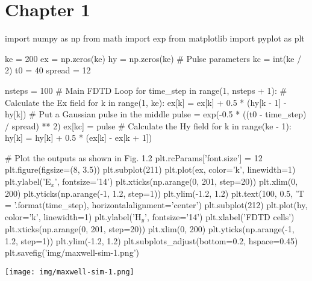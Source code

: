 
\section{Chapter 1}

\begin{python}
import numpy as np
from math import exp
from matplotlib import pyplot as plt
\end{python}

\begin{python}
ke = 200
ex = np.zeros(ke)
hy = np.zeros(ke)
# Pulse parameters
kc = int(ke / 2)
t0 = 40
spread = 12

nsteps = 100
# Main FDTD Loop
for time_step in range(1, nsteps + 1):
  # Calculate the Ex field
  for k in range(1, ke):
    ex[k] = ex[k] + 0.5 * (hy[k - 1] - hy[k])
  # Put a Gaussian pulse in the middle
  pulse = exp(-0.5 * ((t0 - time_step) / spread) ** 2)
  ex[kc] = pulse
  # Calculate the Hy field
  for k in range(ke - 1):
    hy[k] = hy[k] + 0.5 * (ex[k] - ex[k + 1])

# Plot the outputs as shown in Fig. 1.2
plt.rcParams['font.size'] = 12
plt.figure(figsize=(8, 3.5))
plt.subplot(211)
plt.plot(ex, color='k', linewidth=1)
plt.ylabel('E$_x$', fontsize='14')
plt.xticks(np.arange(0, 201, step=20))
plt.xlim(0, 200)
plt.yticks(np.arange(-1, 1.2, step=1))
plt.ylim(-1.2, 1.2)
plt.text(100, 0.5, 'T = {}'.format(time_step),
horizontalalignment='center')
plt.subplot(212)
plt.plot(hy, color='k', linewidth=1)
plt.ylabel('H$_y$', fontsize='14')
plt.xlabel('FDTD cells')
plt.xticks(np.arange(0, 201, step=20))
plt.xlim(0, 200)
plt.yticks(np.arange(-1, 1.2, step=1))
plt.ylim(-1.2, 1.2)
plt.subplots_adjust(bottom=0.2, hspace=0.45)
plt.savefig('img/maxwell-sim-1.png')
\end{python}

\begin{comment}
\begin{result}
\end{result}
\end{comment}

\begin{center}
\texttt{[image: img/maxwell-sim-1.png]}
\end{center}
